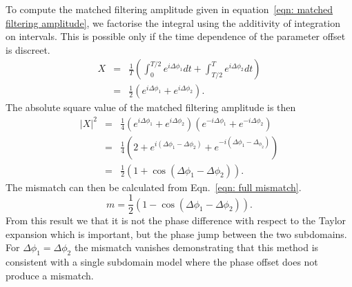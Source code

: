 To compute the matched filtering amplitude given in equation~\eqref{eqn: matched
filtering amplitude}, we factorise the integral using the additivity of
integration on intervals. This is possible only if the time dependence of the
parameter offset is discreet. 
\begin{eqnarray}
X & = &\frac{1}{T }\left(\int_{0}^{T /2}e^{i\Delta\phi_{1}} dt  + 
\int_{T/2}^{T} e^{i\Delta\phi_{2}}dt\right)\\
& = & \frac{1}{2}\left(e^{i\Delta\phi_{1}} + e^{i\Delta\phi_{2}}\right).
\end{eqnarray}
The absolute square value of the matched filtering amplitude is then
\begin{eqnarray}
|X|^{2}& = &\frac{1}{4}\left(e^{i\Delta\phi_{1}} + e^{i\Delta\phi_{2}}\right) \left(e^{-i\Delta\phi_{1}} + e^{-i\Delta\phi_{2}}\right)\\
& = &\frac{1}{4} \left(2 + e^{i(\Delta\phi_{1} - \Delta \phi_{2})} +  e^{-i(\Delta\phi_{1} - \Delta_{\phi_{2}})} \right) \\
& = &\frac{1}{2}\left(1 + \cos(\Delta\phi_{1} - \Delta\phi_{2})\right).
\end{eqnarray}
The mismatch can then be calculated from Eqn.~\eqref{eqn: full mismatch}.
\begin{equation}
m = \frac{1}{2}\left(1 - \cos(\Delta\phi_{1} - \Delta\phi_{2})\right).
\label{eqn: two subdomain phase mismatch}
\end{equation}
From this result we that it is not the phase difference with respect to the
Taylor expansion which is important, but the phase jump between the two
subdomains. For $\Delta \phi_{1} = \Delta \phi_{2}$ the mismatch vanishes
demonstrating that this method is consistent with a single subdomain model where
the phase offset does not produce a mismatch.


